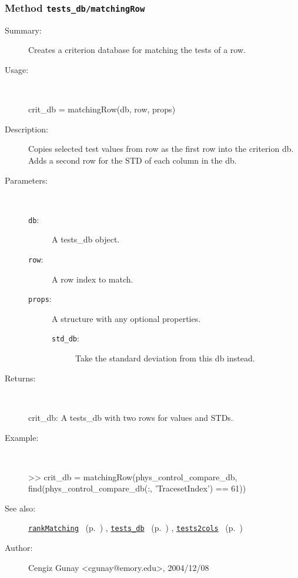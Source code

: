\subsubsection[Method \texttt{matchingRow}]{Method \texttt{tests\_db/matchingRow}}%
%
\label{ref_tests_db__matchingRow}%
\hypertarget{ref_tests_db__matchingRow}{}%
\begin{description}
\item[Summary:]Creates a criterion database for matching the tests of a row.
%
\item[Usage:]~%
\begin{lyxcode}%
crit\_db = matchingRow(db, row, props)
%
\end{lyxcode}%
%
\item[Description:]%
Copies selected test values from row as the first row into the 
 criterion db. Adds a second row for the STD of each column in the db.
\item[Parameters:]~
\begin{description}%
\item[\texttt{db}:]
 A tests\_db object.
\item[\texttt{row}:]
 A row index to match.
\item[\texttt{props}:]
 A structure with any optional properties.
\begin{description}%
\item[\texttt{std\_db}:]
 Take the standard deviation from this db instead.
\end{description}%
\end{description}%
%
\item[Returns:]~

	crit\_db: A tests\_db with two rows for values and STDs.
%
\item[Example:]~
\begin{lyxcode}        >> crit\_db = matchingRow(phys\_control\_compare\_db, \\%
                find(phys\_control\_compare\_db(:, 'TracesetIndex') == 61))\\%
\end{lyxcode}
%
\item[See also:]%
\hyperlink{ref_rankMatching}{\texttt{rankMatching}}%
\ (p.~\pageref{ref_rankMatching})%
%
, \hyperlink{ref_tests_db}{\texttt{tests\_db}}%
\ (p.~\pageref{ref_tests_db})%
%
, \hyperlink{ref_tests2cols}{\texttt{tests2cols}}%
\ (p.~\pageref{ref_tests2cols})%
%
%
\item[Author:]%
Cengiz Gunay <cgunay@emory.edu>, 2004/12/08%
\end{description}
\methodline%
